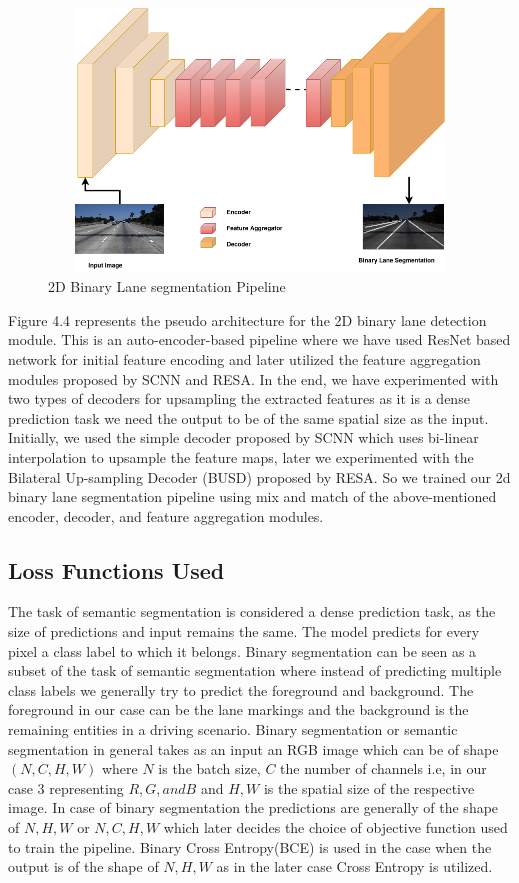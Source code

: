            \begin{figure}[h]
    \centering
    \includegraphics[width=12cm, height=7cm]{images/2dlane_pipleline.png}
    \caption{2D Binary Lane segmentation Pipeline}
    \end{figure}
        
        Figure 4.4 represents the pseudo architecture for the 2D binary lane detection module. This is an auto-encoder-based pipeline where we have used ResNet \cite{DBLP:journals/corr/HeZRS15} based network for initial feature encoding and later utilized the feature aggregation modules proposed by SCNN\cite{pan2018SCNN} and RESA\cite{DBLP:journals/corr/abs-2008-13719}. In the end, we have experimented with two types of decoders for upsampling the extracted features as it is a dense prediction task we need the output to be of the same spatial size as the input. Initially, we used the simple decoder proposed by SCNN\cite{pan2018SCNN} which uses bi-linear interpolation to upsample the feature maps, later we experimented with the Bilateral Up-sampling Decoder (BUSD) proposed by RESA\cite{DBLP:journals/corr/abs-2008-13719}. So we trained our 2d binary lane segmentation pipeline using mix and match of the above-mentioned encoder, decoder, and feature aggregation modules.
        
        \subsection{Loss Functions Used}
        The task of semantic segmentation is considered a dense prediction task, as the size of predictions and input remains the same. The model predicts for every pixel a class label to which it belongs. Binary segmentation can be seen as a subset of the task of semantic segmentation where instead of predicting multiple class labels we generally try to predict the foreground and background. The foreground in our case can be the lane markings and the background is the remaining entities in a driving scenario.
        Binary segmentation or semantic segmentation in general takes as an input an RGB image which can be of shape $(N,C,H,W)$ where $N$ is the batch size, $C$ the number of channels i.e, in our case 3 representing $R, G, and B$ and $H,W$ is the spatial size of the respective image. In case of binary segmentation the predictions are generally of the shape of $N,H,W$ or $N,C,H,W$ which later decides the choice of objective function used to train the pipeline. Binary Cross Entropy(BCE) is used in the case when the output is of the shape of $N,H,W$ as in the later case Cross Entropy is utilized.
        
